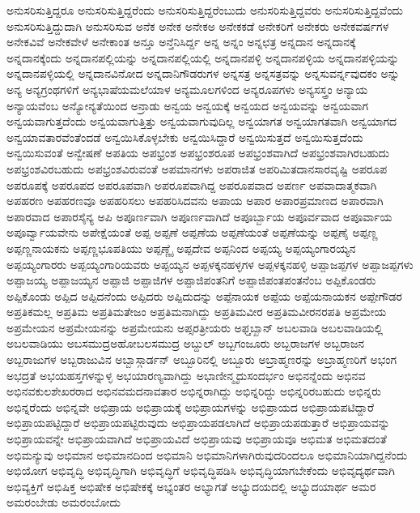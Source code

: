 {ಅನುಸರಿಸುತ್ತಿದ್ದರೂ
ಅನುಸರಿಸುತ್ತಿದ್ದರೆಂದು
ಅನುಸರಿಸುತ್ತಿದ್ದರೆಂಬುದು
ಅನುಸರಿಸುತ್ತಿದ್ದವರು
ಅನುಸರಿಸುತ್ತಿದ್ದವೆಂದು
ಅನುಸರಿಸುತ್ತಿದ್ದುದಾಗಿ
ಅನುಸರಿಸುವ
ಅನೆಕ
ಅನೇಕ
ಅನೇಕಅ
ಅನೇಕಕಡೆ
ಅನೇಕರಿಗೆ
ಅನೇಕರು
ಅನೇಕವರ್ಷಗಳ
ಅನೇಕವಿವೆ
ಅನೇಕವೇಳೆ
ಅನೇಕಾಂತ
ಅನ್ತೂ
ಅನ್ತೆನಿಸಿರ್ದ್ದ
ಅನ್ನ
ಅನ್ನಂ
ಅನ್ನಛತ್ರ
ಅನ್ನದಾನ
ಅನ್ನದಾನಕ್ಕೆ
ಅನ್ನದಾನಕ್ಕೆಂದು
ಅನ್ನದಾನಪಲ್ಲಿಯನ್ನು
ಅನ್ನದಾನಪಲ್ಲಿಯಲ್ಲಿ
ಅನ್ನದಾನಪಳ್ಳಿ
ಅನ್ನದಾನಪಳ್ಳಿಯ
ಅನ್ನದಾನಪಳ್ಳಿಯನ್ನು
ಅನ್ನದಾನಪಳ್ಳಿಯಲ್ಲಿ
ಅನ್ನದಾನವಿನೋದ
ಅನ್ನದಾನಿಗೌಡರುಗಳ
ಅನ್ನಸತ್ರ
ಅನ್ನಸತ್ರವನ್ನು
ಅನ್ನಸುವರ್ನ್ನವುದಕಂ
ಅನ್ನು
ಅನ್ಯ
ಅನ್ಯಗ್ರಂಥಗಳಿಗೆ
ಅನ್ಯಭಾಷೆಯಮಲೆಯಾಳ
ಅನ್ಯಮೂಲಗಳಿಂದ
ಅನ್ಯರೂಪಗಳು
ಅನ್ಯಸಸ್ತ್ರಂ
ಅನ್ಯಾಯ
ಅನ್ಯಾಯವೆಂಬ
ಅನ್ಯೋನ್ಯತೆಯಿಂದ
ಅನ್ರಾಡು
ಅನ್ವಯ
ಅನ್ವಯಕ್ಕೆ
ಅನ್ವಯದ
ಅನ್ವಯವನ್ನು
ಅನ್ವಯವಾಗ
ಅನ್ವಯವಾಗುತ್ತದೆಂದು
ಅನ್ವಯವಾಗುತ್ತಿತ್ತು
ಅನ್ವಯವಾಗುವುದಿಲ್ಲ
ಅನ್ವಯಾಗತ
ಅನ್ವಯಾಗತವಾಗಿ
ಅನ್ವಯಾಗದ
ಅನ್ವಯಾವತಾರವೆಂತೆಂದಡೆ
ಅನ್ವಯಿಸಿಕೊಳ್ಳಬೇಕು
ಅನ್ವಯಿಸಿದ್ದಾರೆ
ಅನ್ವಯಿಸುತ್ತದೆ
ಅನ್ವಯಿಸುತ್ತದೆಂದು
ಅನ್ವಯಿಸುವಂತೆ
ಅನ್ವೇಷಣೆ
ಅಪತಿಯ
ಅಪಭ್ರಂಶ
ಅಪಭ್ರಂಶರೂಪ
ಅಪಭ್ರಂಶವಾಗಿದೆ
ಅಪಭ್ರಂಶವಾಗಿರಬಹುದು
ಅಪಭ್ರಂಶವಿರಬಹುದು
ಅಪಭ್ರಂಶವಿರುವಂತೆ
ಅಪಮಾನಗಳು
ಅಪರಾಜಿತ
ಅಪರಿಮಿತದಾನಸಾರವೃಷ್ಟಿ
ಅಪರೂಪ
ಅಪರೂಪಕ್ಕೆ
ಅಪರೂಪದ
ಅಪರೂಪವಾಗಿ
ಅಪರೂಪವಾಗಿದ್ದ
ಅಪರೂಪವಾದ
ಅಪರ್ಣ
ಅಪವಾದಾತ್ಮಕವಾಗಿ
ಅಪಹರಣ
ಅಪಹರಣವೂ
ಅಪಹರಿಸಲು
ಅಪಹರಿಸಿದವನು
ಅಪಾಯ
ಅಪಾರ
ಅಪಾರಪ್ರಮಾಣದ
ಅಪಾರವಾಗಿ
ಅಪಾರವಾದ
ಅಪಾರಸೈನ್ಯ
ಅಪಿ
ಅಪೂರ್ಣವಾಗಿ
ಅಪೂರ್ಣವಾಗಿದೆ
ಅಪೂರ್ಬ್ಬಾಯ
ಅಪೂರ್ವವಾದ
ಅಪೂರ್ವಾಯ
ಅಪೂರ್ವ್ವಾಯವೇನು
ಅಪೇಕ್ಷೆಯಂತೆ
ಅಪ್ಪ
ಅಪ್ಪಣೆ
ಅಪ್ಪಣೆಯ
ಅಪ್ಪಣೆಯಂತೆ
ಅಪ್ಪಣೆಯನ್ನು
ಅಪ್ಪಣೈ
ಅಪ್ಪಣ್ಣ
ಅಪ್ಪಣ್ಣನಾಯಕನು
ಅಪ್ಪಣ್ಣಭೂಪತಿಯು
ಅಪ್ಪಣ್ಣೈ
ಅಪ್ಪದೇವ
ಅಪ್ಪನಿಂದ
ಅಪ್ಪಯ್ಯ
ಅಪ್ಪಯ್ಯಂಗಾರಯ್ಯನ
ಅಪ್ಪಯ್ಯಂಗಾರರು
ಅಪ್ಪಯ್ಯಂಗಾರಿಯವರು
ಅಪ್ಪಯ್ಯನ
ಅಪ್ಪಳಕ್ಕನಹಳ್ಳಗಳ
ಅಪ್ಪಳಕ್ಕನಹಳ್ಳಿ
ಅಪ್ಪಾಜಪ್ಪಗಳ
ಅಪ್ಪಾಜಪ್ಪಗಳು
ಅಪ್ಪಾಜಯ್ಯ
ಅಪ್ಪಾಜಯ್ಯನ
ಅಪ್ಪಾಜಿ
ಅಪ್ಪಾಜಿಗಳ
ಅಪ್ಪಾಜಿಪಂತನಿಗೆ
ಅಪ್ಪಾಜಿಪಂತಪಂತನೆಂಬ
ಅಪ್ಪಿಕೊಂಡರು
ಅಪ್ಪಿಕೊಂಡು
ಅಪ್ಪಿದ
ಅಪ್ಪಿದನೆಂದು
ಅಪ್ಪಿದರು
ಅಪ್ಪಿದುದನ್ನು
ಅಪ್ಪೆನಾಯಕ
ಅಪ್ಪೆಯ
ಅಪ್ಪೆಯನಾಯಕನ
ಅಪ್ಪೇಗೌಡರ
ಅಪ್ರತಿಕಮಲ್ಲ
ಅಪ್ರತಿಮ
ಅಪ್ರತಿಮತೇಜಂ
ಅಪ್ರತಿಮನಾಗಿದ್ದು
ಅಪ್ರತಿಮವೀರ
ಅಪ್ರತಿಮವೀರನರಪತಿ
ಅಪ್ರಮೇಯ
ಅಪ್ರಮೇಯನ
ಅಪ್ರಮೇಯನನ್ನು
ಅಪ್ರಮೇಯನು
ಅಪ್ಸರತ್ರೀಯರು
ಅಫ್ತಬ್ಖಾನ್
ಅಬಲವಾಡಿ
ಅಬಲವಾಡಿಯಲ್ಲಿ
ಅಬಲವಾಡಿಯು
ಅಬಸಮುದ್ರಅಹೋಬಲಸಮುದ್ರ
ಅಬ್ದುಲ್
ಅಬ್ಬಗಂಜೂರು
ಅಬ್ಬರಾಜಗಳ
ಅಬ್ಬರಾಜನ
ಅಬ್ಬರಾಜುಗಳ
ಅಬ್ಬರಾಜುವಿನ
ಅಬ್ಬಾಸ್ಗಾರ್ಡನ್
ಅಬ್ಬೂರಿನಲ್ಲಿ
ಅಬ್ಬೂರು
ಅಬ್ರಾಹ್ಮಣರನ್ನು
ಅಬ್ರಾಹ್ಮಣರಿಗೆ
ಅಭಂಗ
ಅಭದ್ರತೆ
ಅಭಯಹಸ್ತಗಳನ್ನುಳ್ಳ
ಅಭಯಾರಣ್ಯವಾಗಿದ್ದು
ಅಭಾಣೀನ್ಮೃದುಸಂದರ್ಭಂ
ಅಭಿನನ್ನೆಂದು
ಅಭಿನವ
ಅಭಿನವಕುಲಶೇಖರರಾದ
ಅಭಿನವಮದನಾವತಾರ
ಅಭಿನ್ನರಾಗಿದ್ದು
ಅಭಿನ್ನರಿದ್ದು
ಅಭಿನ್ನರಿರಬಹುದು
ಅಭಿನ್ನರು
ಅಭಿನ್ನರೆಂದು
ಅಭಿನ್ನವೇ
ಅಭಿಪ್ರಾಯ
ಅಭಿಪ್ರಾಯಕ್ಕೆ
ಅಭಿಪ್ರಾಯಗಳನ್ನು
ಅಭಿಪ್ರಾಯದ
ಅಭಿಪ್ರಾಯಪಟಿದ್ದಾರೆ
ಅಭಿಪ್ರಾಯಪಟ್ಟಿದ್ದಾರೆ
ಅಭಿಪ್ರಾಯಪಟ್ಟಿರುವುದು
ಅಭಿಪ್ರಾಯಪಡಲಾಗಿದೆ
ಅಭಿಪ್ರಾಯಪಡುತ್ತಾರೆ
ಅಭಿಪ್ರಾಯವನ್ನು
ಅಭಿಪ್ರಾಯವನ್ನೇ
ಅಭಿಪ್ರಾಯವಾಗಿದೆ
ಅಭಿಪ್ರಾಯವಿದೆ
ಅಭಿಪ್ರಾಯವು
ಅಭಿಪ್ರಾಯವೂ
ಅಭಿಮತ
ಅಭಿಮತದಂತೆ
ಅಭಿಮನ್ಯುವು
ಅಭಿಮಾನ
ಅಭಿಮಾನದಿಂದ
ಅಭಿಮಾನಿ
ಅಭಿಮಾನಿಗಳಾಗಿರುವುದರಿಂದಲೂ
ಅಭಿಮಾನಿಯಾಗಿದ್ದನೆಂದು
ಅಭಿಯೋಗ
ಅಭಿವೃದ್ಧಿ
ಅಭಿವೃದ್ಧಿಗಾಗಿ
ಅಭಿವೃದ್ಧಿಗೆ
ಅಭಿವೃದ್ಧಿಪಡಿಸಿ
ಅಭಿವೃದ್ಧಿಯಾಗಬೇಕೆಂದು
ಅಭಿವೃದ್ಯರ್ಥವಾಗಿ
ಅಭಿವ್ಯಕ್ತಿಗೆ
ಅಭಿಷಿಕ್ತ
ಅಭಿಷೇಕ
ಅಭಿಷೇಕಕ್ಕೆ
ಅಭ್ಯಂತರ
ಅಭ್ಯಾಗತೆ
ಅಭ್ಯುದಯದಲ್ಲಿ
ಅಭ್ಯುದಯಾರ್ಥ
ಅಮರ
ಅಮರಂಬೇಡು
ಅಮರಂಬೋದು
}
